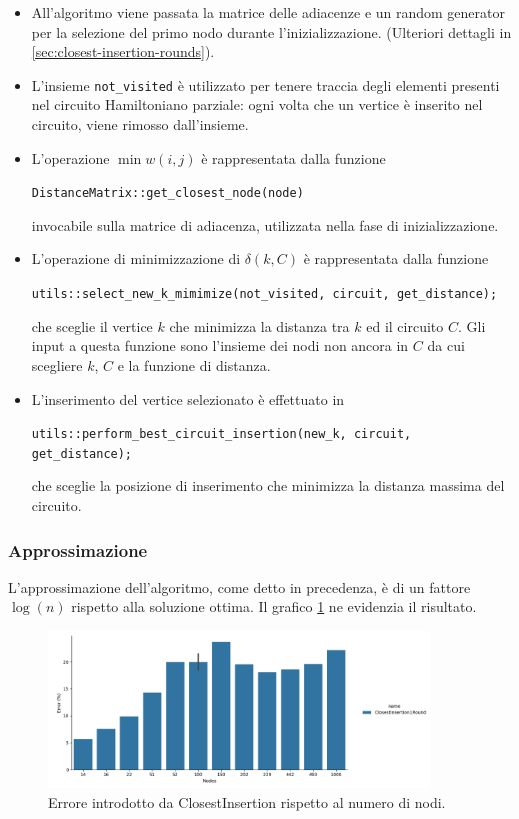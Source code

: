 \begin{itemize}
    \item All'algoritmo viene passata la matrice delle adiacenze e un
      random generator per la selezione del primo nodo durante
      l'inizializzazione. (Ulteriori dettagli in
      \ref{sec:closest-insertion-rounds}).

    \item L'insieme \texttt{not_visited} è utilizzato per
      tenere traccia degli elementi presenti nel circuito Hamiltoniano
      parziale: ogni volta che un vertice è inserito nel circuito,
      viene rimosso dall'insieme.

    \item L'operazione $\min w(i, j)$ è rappresentata dalla funzione
    \begin{center}
        \texttt{DistanceMatrix::get_closest_node(node)}
    \end{center}
    invocabile sulla matrice di adiacenza, utilizzata nella fase di
    inizializzazione.

    \item L'operazione di minimizzazione di $\delta(k, C)$ è
      rappresentata dalla funzione
    \begin{center}
        \texttt{utils::select_new_k_mimimize(not_visited, circuit, get_distance);}
    \end{center}
    che sceglie il vertice $k$ che minimizza la distanza tra $k$
    ed il circuito $C$. Gli input a questa funzione sono l'insieme
    dei nodi non ancora in $C$ da cui scegliere $k$, $C$ e la
    funzione di distanza.

    \item L'inserimento del vertice selezionato è effettuato in
    \begin{center}
        \texttt{utils::perform_best_circuit_insertion(new_k, circuit, get_distance);}
    \end{center}
    che sceglie la posizione di inserimento che minimizza la distanza
    massima del circuito.
\end{itemize}

\subsubsection{Approssimazione}

L'approssimazione dell'algoritmo, come detto in precedenza, è di un
fattore $\log(n)$ rispetto alla soluzione ottima. Il grafico
\ref{fig:closest-insertion-1-round-accuracy-error} ne evidenzia il
risultato.

\begin{figure}[!ht]
    \centering

    \includegraphics[width=0.9\textwidth]{./images/ClosestInsertion1Round__approximation_error_.png}

    \caption{Errore introdotto da ClosestInsertion rispetto al numero di nodi.}
    \label{fig:closest-insertion-1-round-accuracy-error}
\end{figure}
